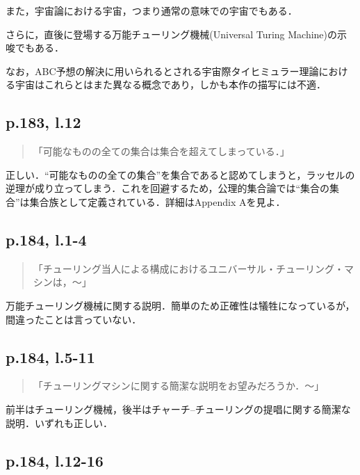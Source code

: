 \documentclass[10pt, a5paper, twoside]{ltjsarticle}
\newcommand{\hyphen}{\insertkanjiskip--\insertkanjiskip}
\begin{document}
            また，宇宙論における宇宙，つまり通常の意味での宇宙でもある．

            さらに，直後に登場する万能チューリング機械(Universal Turing Machine)の示唆でもある．

            なお，ABC予想の解決に用いられるとされる宇宙際タイヒミュラー理論における宇宙はこれらとはまた異なる概念であり，しかも本作の描写には不適．

        \subsection{p.183, l.12}

            \begin{quote}
                「可能なものの全ての集合は集合を超えてしまっている．」
            \end{quote}

            正しい．“可能なものの全ての集合”を集合であると認めてしまうと，ラッセルの逆理が成り立ってしまう．これを回避するため，公理的集合論では“集合の集合”は集合族として定義されている．詳細は\cite{kmoonshine}Appendix Aを見よ．

        \subsection{p.184, l.1-4}

            \begin{quote}
                「チューリング当人による構成におけるユニバーサル・チューリング・マシンは，〜」
            \end{quote}

            万能チューリング機械に関する説明．簡単のため正確性は犠牲になっているが，間違ったことは言っていない．

        \subsection{p.184, l.5-11}

            \begin{quote}
                「チューリングマシンに関する簡潔な説明をお望みだろうか．〜」
            \end{quote}

            前半はチューリング機械，後半はチャーチ\hyphen チューリングの提唱に関する簡潔な説明．いずれも正しい．

        \subsection{p.184, l.12-16}
\end{document}
